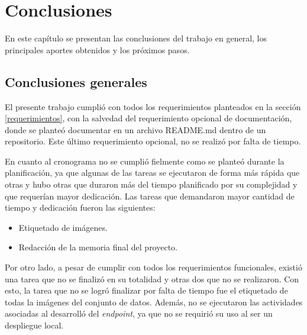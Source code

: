 
\chapter{Conclusiones} %

\label{Chapter5} %




En este capítulo se presentan las conclusiones del trabajo en general, los principales aportes obtenidos y los próximos pasos.

\section{Conclusiones generales }

El presente trabajo cumplió con todos los requerimientos planteados en la sección \ref{requerimientos}, con la salvedad del requerimiento opcional de documentación, donde se planteó documentar en un archivo README.md dentro de un repositorio. Este último requerimiento opcional, no se realizó por falta de tiempo.

En cuanto al cronograma no se cumplió fielmente como se planteó durante la planificación, ya que algunas de las tareas se ejecutaron de forma más rápida que otras y hubo otras que duraron más del tiempo planificado por su complejidad y que requerían mayor dedicación. Las tareas que demandaron mayor cantidad de tiempo y dedicación fueron las siguientes:

\begin{itemize}
\item Etiquetado de imágenes.
\item Redacción de la memoria final del proyecto. 
\end{itemize}

Por otro lado, a pesar de cumplir con todos los requerimientos funcionales, existió una tarea que no se finalizó en su totalidad y otras dos que no se realizaron. Con esto, la tarea que no se logró finalizar por falta de tiempo fue el etiquetado de todas la imágenes del conjunto de datos. Además, no se ejecutaron las actividades asociadas al desarrolló del \textit{endpoint}, ya que no se requirió su uso al ser un despliegue local.

